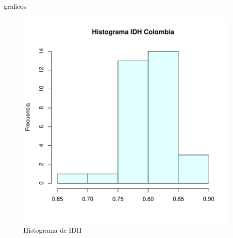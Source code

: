 \documentclass{article}
\begin{document}
graficos

\begin{figure}[h]
\centering
\begin{adjustbox}{width=5cm,height=5cm,clip,trim=1.5cm 0.5cm 0cm 1.5cm}
\includegraphics{Proyecto-003}
\end{adjustbox}
\caption{Histograma de IDH}
\label{histogramaIDH}
\end{figure}
\end{document}
